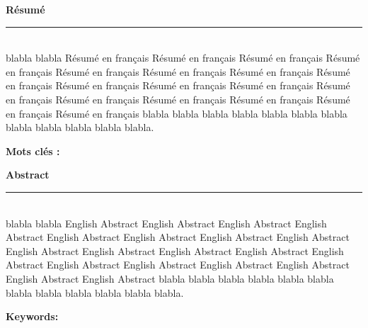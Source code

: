 \documentclass[12pt,a4paper]{report}
\begin{document}
\newcommand{\HRule}{\rule{\linewidth}{0.5mm}}
\textbf{Résumé} \\
\HRule  \\
blabla blabla Résumé en français Résumé en français Résumé en français Résumé en français Résumé en français Résumé en français Résumé en français Résumé en français Résumé en français Résumé en français Résumé en français Résumé en français Résumé en français Résumé en français Résumé en français Résumé en français Résumé en français blabla blabla blabla blabla blabla blabla blabla blabla blabla blabla blabla blabla.

\smallskip
\textbf{Mots clés :} 
 
\vskip2cm
\textbf{Abstract} \\
\HRule \\
blabla blabla English Abstract English Abstract English Abstract English Abstract English Abstract English Abstract English Abstract English Abstract English Abstract English Abstract English Abstract English Abstract English Abstract English Abstract English Abstract English Abstract English Abstract English Abstract English Abstract blabla blabla blabla blabla blabla blabla blabla blabla blabla blabla blabla blabla.

\smallskip
\textbf{Keywords:} 
\end{document}
